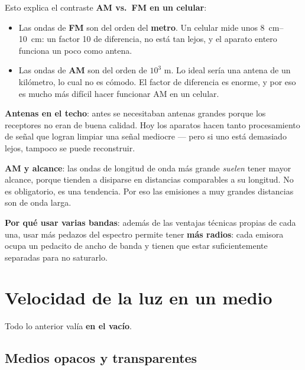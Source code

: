 \documentclass[12pt,a4paper]{article}
\begin{document}
Esto explica el contraste \textbf{AM vs.\ FM en un celular}:

\begin{itemize}
  \item Las ondas de \textbf{FM} son del orden del \textbf{metro}. Un celular mide
        unos \SIrange{8}{10}{\centi\metre}: un factor 10 de diferencia, no está
        tan lejos, y el aparato entero funciona un poco como antena.
  \item Las ondas de \textbf{AM} son del orden de $10^3$ m. Lo ideal sería una
        antena de un kilómetro, lo cual no es cómodo. El factor de diferencia es
        enorme, y por eso es mucho más difícil hacer funcionar AM en un celular.
\end{itemize}



\begin{notebox}
\textbf{Antenas en el techo}: antes se necesitaban antenas grandes porque los
receptores no eran de buena calidad. Hoy los aparatos hacen tanto procesamiento de
señal que logran limpiar una señal mediocre --- pero si uno está demasiado lejos,
tampoco se puede reconstruir.

\textbf{AM y alcance}: las ondas de longitud de onda más grande \emph{suelen}
tener mayor alcance, porque tienden a disiparse en distancias comparables a su
longitud. No es obligatorio, es una tendencia. Por eso las emisiones a muy grandes
distancias son de onda larga.

\textbf{Por qué usar varias bandas}: además de las ventajas técnicas propias de
cada una, usar más pedazos del espectro permite tener \textbf{más radios}: cada
emisora ocupa un pedacito de ancho de banda y tienen que estar suficientemente
separadas para no saturarlo.
\end{notebox}

\section{Velocidad de la luz en un medio}

Todo lo anterior valía \textbf{en el vacío}.

\subsection{Medios opacos y transparentes}
\end{document}
